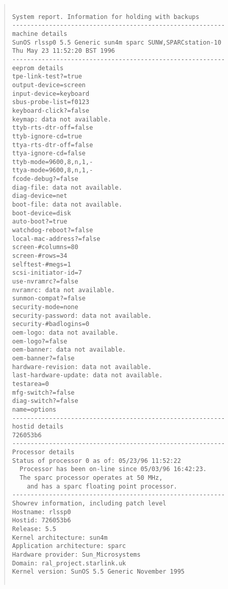 \begin{quote}
\begin{verbatim}

System report. Information for holding with backups
----------------------------------------------------------
machine details
SunOS rlssp0 5.5 Generic sun4m sparc SUNW,SPARCstation-10
Thu May 23 11:52:20 BST 1996
----------------------------------------------------------
eeprom details
tpe-link-test?=true
output-device=screen
input-device=keyboard
sbus-probe-list=f0123
keyboard-click?=false
keymap: data not available.
ttyb-rts-dtr-off=false
ttyb-ignore-cd=true
ttya-rts-dtr-off=false
ttya-ignore-cd=false
ttyb-mode=9600,8,n,1,-
ttya-mode=9600,8,n,1,-
fcode-debug?=false
diag-file: data not available.
diag-device=net
boot-file: data not available.
boot-device=disk
auto-boot?=true
watchdog-reboot?=false
local-mac-address?=false
screen-#columns=80
screen-#rows=34
selftest-#megs=1
scsi-initiator-id=7
use-nvramrc?=false
nvramrc: data not available.
sunmon-compat?=false
security-mode=none
security-password: data not available.
security-#badlogins=0
oem-logo: data not available.
oem-logo?=false
oem-banner: data not available.
oem-banner?=false
hardware-revision: data not available.
last-hardware-update: data not available.
testarea=0
mfg-switch?=false
diag-switch?=false
name=options
----------------------------------------------------------
hostid details
726053b6
----------------------------------------------------------
Processor details
Status of processor 0 as of: 05/23/96 11:52:22
  Processor has been on-line since 05/03/96 16:42:23.
  The sparc processor operates at 50 MHz,
	and has a sparc floating point processor.
----------------------------------------------------------
Showrev information, including patch level
Hostname: rlssp0
Hostid: 726053b6
Release: 5.5
Kernel architecture: sun4m
Application architecture: sparc
Hardware provider: Sun_Microsystems
Domain: ral_project.starlink.uk
Kernel version: SunOS 5.5 Generic November 1995


\end{verbatim}
\end{quote}
